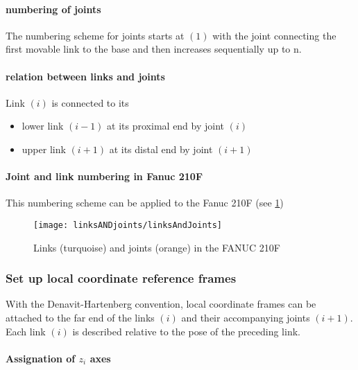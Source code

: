 \paragraph{numbering of joints}
The numbering scheme for joints starts at $(1)$ with the joint connecting the first movable link to the base and then increases sequentially up to n.

\paragraph{relation between links and joints}
Link $(i)$ is connected to its 
\begin{itemize}
	\item lower link $(i-1)$ at its proximal \cite{proxdist} end by joint $(i)$
	\item upper link $(i+1)$ at its distal \cite{proxdist} end by joint $(i+1)$
\end{itemize}

\paragraph{Joint and link numbering in Fanuc 210F}

This numbering scheme can be applied to the Fanuc 210F (see \ref{fig:LinksANDJoints210F}) 


\begin{figure}[H]
	\texttt{[image: linksANDjoints/linksAndJoints]}
	\caption{Links (turquoise) and joints (orange) in the FANUC 210F}
	\label{fig:LinksANDJoints210F}
\end{figure}



\subsubsection{Set up local coordinate reference frames}
With the Denavit-Hartenberg convention, local coordinate frames can be attached to the far end of the links $ (i) $ and their accompanying joints $ (i+1) $.
Each link $(i)$ is described relative to the pose of the preceding link.



\paragraph{Assignation of $z_i$ axes}

